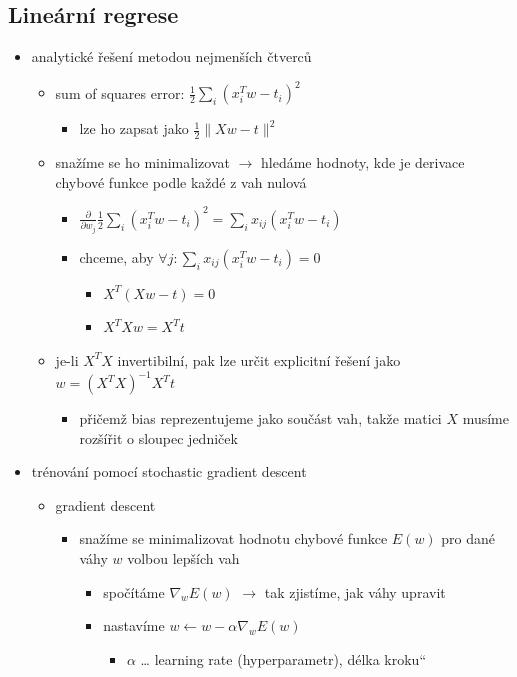 \subsection{Lineární regrese}
\begin{itemize}
\item analytické řešení metodou nejmenších čtverců
\begin{itemize}
\item sum of squares error: $\frac12\sum_{i}(x_i^Tw-t_i)^2$
\begin{itemize}
\item lze ho zapsat jako $\frac12\lVert Xw-t\rVert^2$
\end{itemize}
\item snažíme se ho minimalizovat $\to$ hledáme hodnoty, kde je derivace chybové funkce podle každé z vah nulová
\begin{itemize}
\item $\frac{\partial}{\partial w_j}\frac12\sum_{i}(x_i^Tw-t_i)^2=\sum_i x_{ij}(x_i^Tw-t_i)$
\item chceme, aby $\forall j:\sum_i x_{ij}(x_i^Tw-t_i)=0$
\begin{itemize}
\item $X^T(Xw-t)=0$
\item $X^TXw=X^Tt$
\end{itemize}
\end{itemize}
\item je-li $X^TX$ invertibilní, pak lze určit explicitní řešení jako $w=(X^TX)^{-1}X^Tt$
\begin{itemize}
\item přičemž bias reprezentujeme jako součást vah, takže matici $X$ musíme rozšířit o sloupec jedniček
\end{itemize}
\end{itemize}
\item trénování pomocí stochastic gradient descent
\begin{itemize}
\item gradient descent
\begin{itemize}
\item snažíme se minimalizovat hodnotu chybové funkce $E(w)$ pro dané váhy $w$ volbou lepších vah
\begin{itemize}
\item spočítáme $\nabla_wE(w)$ $\to$ tak zjistíme, jak váhy upravit
\item nastavíme $w\leftarrow w-\alpha\nabla_wE(w)$
\begin{itemize}
\item $\alpha$ \dots{} learning rate (hyperparametr), \quotedblbase{}délka kroku\textquotedblleft{}

\end{itemize}
\end{itemize}
\end{itemize}
\end{itemize}
\end{itemize}
